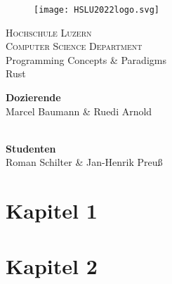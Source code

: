 \documentclass[10.5pt]{article}
\begin{document}


\begin{titlepage}
\begin{figure}[t]
    \centering\texttt{[image: HSLU2022logo.svg]}
    \label{fig:hslu-title}
\end{figure}

\begin{center}
    \textsc{\LARGE{Hochschule Luzern\\}}
	\textsc{ \LARGE{Computer Science Department\\ }}
	\vspace{40mm}
    \textnormal
    Programming Concepts \& Paradigms\\
	\vspace{4mm}
	\fontsize{10mm}{7mm}\selectfont
    \textup{Rust}\\
\end{center}

\vspace{25mm}

\begin{minipage}[t]{0.47\textwidth}
	\textnormal{\large{\bf Dozierende\\}}
	{\large Marcel Baumann \& Ruedi Arnold\\ \\}
\end{minipage}\hfill\begin{minipage}[t]{0.47\textwidth}\raggedleft
	\textnormal{\large{\bf Studenten\\}}
	{\large Roman Schilter \& Jan-Henrik Preuß}
\end{minipage}

\vspace{20mm}


\end{titlepage}


\newpage


\section{Kapitel 1}
\lipsum[10]

\section{Kapitel 2}
\end{document}
